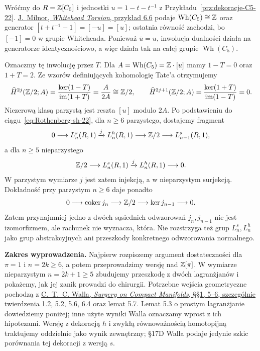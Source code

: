 \begin{przyklad}
\label{prz:Tate-C5-22}
Wróćmy do $R=\mathbb{Z}[C_5]$ i jednostki
$u=1-t-t^{-1}$ z Przykładu~\ref{prz:dekoracje-C5-22}.
\href{https://webhomes.maths.ed.ac.uk/~v1ranick/papers/milnorwh.pdf}
{J.\ Milnor, \emph{Whitehead Torsion}, przykład 6.6}
podaje $\operatorname{Wh}(C_5)\cong\mathbb{Z}$ oraz
generator $[t+t^{-1}-1]=[-u]=[u]$;
ostatnia równość zachodzi, bo $[-1]=0$
w grupie Whiteheada. Ponieważ $\bar u=u$,
inwolucja dualności działa na generatorze
identycznościowo, a więc działa tak na całej
grupie $\operatorname{Wh}(C_5)$.

Oznaczmy tę inwolucję przez $T$. Dla
$A=\operatorname{Wh}(C_5)=\mathbb{Z}\cdot[u]$
mamy $1-T=0$ oraz $1+T=2$. Ze wzorów
definiujących kohomologię Tate'a otrzymujemy
\[
 \widehat H^{2j}(\mathbb{Z}/2;A)
 =\frac{\ker(1-T)}{\operatorname{im}(1+T)}
 =\frac{A}{2A}\cong\mathbb{Z}/2,
 \qquad
 \widehat H^{2j+1}(\mathbb{Z}/2;A)
 =\frac{\ker(1+T)}{\operatorname{im}(1-T)}=0.
\]
Niezerową klasą parzystą jest reszta $[u]$
modulo $2A$. Po podstawieniu do
ciągu~\eqref{eq:Rothenberg-sh-22}, dla
$n\geq6$ parzystego, dostajemy fragment
\[
 0\longrightarrow L^s_n(R,1)
 \xrightarrow{j}L^h_n(R,1)
 \longrightarrow\mathbb{Z}/2\longrightarrow L^s_{n-1}(R,1),
\]
a dla $n\geq5$ nieparzystego
\[
 \mathbb{Z}/2\longrightarrow L^s_n(R,1)
 \xrightarrow{j}L^h_n(R,1)\longrightarrow0.
\]
W parzystym wymiarze $j$ jest zatem injekcją,
a w nieparzystym surjekcją. Dokładność przy
parzystym $n\geq6$ daje ponadto
\[
 0\longrightarrow\operatorname{coker}j_n
 \longrightarrow\mathbb{Z}/2\longrightarrow
 \ker j_{n-1}\longrightarrow0.
\]
Zatem przynajmniej jedno z dwóch sąsiednich odwzorowań
$j_n,j_{n-1}$ nie jest izomorfizmem, ale rachunek
nie wyznacza, która. Nie rozstrzyga też grup
$L^s_n,L^h_n$ jako grup abstrakcyjnych ani
przeszkody konkretnego odwzorowania normalnego.
\end{przyklad}

\noindent\textbf{Zakres wyprowadzenia.}
Najpierw rozpiszemy argument dostateczności
dla $\pi=1$ i $n=2k\geq6$, a potem
przeprowadzimy wersję nad $\mathbb{Z}[\pi]$.
W wymiarze nieparzystym $n=2k+1\geq5$
zbudujemy przeszkodę z dwóch lagranżjanów
i pokażemy, jak jej zanik prowadzi do chirurgii.
Potrzebne wejścia geometryczne
pochodzą z
\href{https://webhomes.maths.ed.ac.uk/~v1ranick/books/scm.pdf}
{C.~T.~C. Walla, \emph{Surgery on Compact Manifolds},
§§1, 5--6, szczególnie twierdzenia 1.2, 5.2,
5.6, 6.4 oraz lemat 5.7}.
Lemat 5.3 o prostym lagranżjanie dowiedziemy
poniżej; inne użyte wyniki Walla oznaczamy
wprost z ich hipotezami. Wersję z dekoracją
$h$ i zwykłą równoważnością homotopijną
traktujemy oddzielnie jako wynik zewnętrzny;
§17D Walla podaje jedynie szkic porównania
tej dekoracji z wersją $s$.

